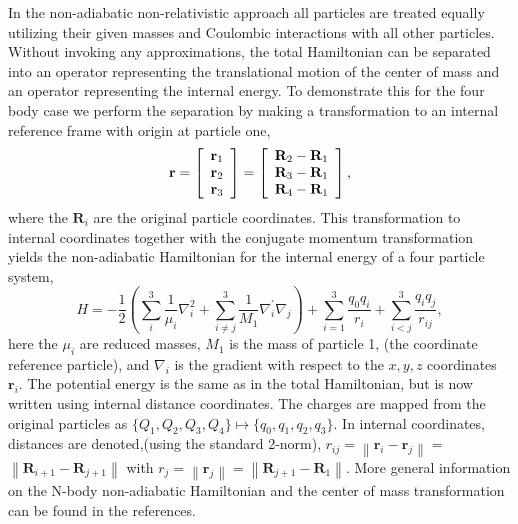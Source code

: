 In the non-adiabatic non-relativistic approach all particles are
treated equally utilizing their given masses and Coulombic
interactions with all other particles.  Without invoking any
approximations, the total Hamiltonian can be separated into an
operator representing the translational motion of the center of mass
and an operator representing the internal energy.  To demonstrate this
for the four body case we perform the separation by making a
transformation to an internal reference frame with origin at particle
one,
\begin{equation} \label{rdef}
\mathbf{r}=\left[
  \begin{array}[c]{c}
    \mathbf{r}_{1}\\
    \mathbf{r}_{2}\\
    \mathbf{r}_{3}
  \end{array}
  \right]  
  = \left[
    \begin{array}[c]{c}
      \mathbf{R}_{2}-\mathbf{R}_{1}\\
      \mathbf{R}_{3}-\mathbf{R}_{1}\\
      \mathbf{R}_{4}-\mathbf{R}_{1}\\
    \end{array}
  \right],
\end{equation}
where the $\mathbf{R}_{i}$ are the original particle coordinates.
This transformation to  internal coordinates together with the 
conjugate momentum transformation yields the non-adiabatic Hamiltonian
for the internal energy of a four particle system,
\begin{equation} \label{intham1}
H=-\frac{1}{2}\left(  \sum_{i}^{3}\frac{1}{\mu_{i}}\nabla_{i}^{2}
  +\sum_{i\neq j}^{3}\frac{1}{M_{1}}\nabla_{i}^{\prime}\nabla_{j} \right)
  +\sum_{i=1}^{3}\frac{q_{0}q_{i}}{r_{i}}  
  +\sum_{i<j}^{3}\frac{q_{i}q_{j}}{r_{ij}},
\end{equation}
here the $\mu_{i}$ are reduced masses, $M_{1}$ is the mass of particle 1,
(the coordinate reference particle), and $\nabla_{i}$ is the gradient with
respect to the $x,y,z$ coordinates $\mathbf{r}_{i}$. The potential energy is
the same as in the total Hamiltonian, but is now written using internal
distance coordinates. The charges are mapped from the original particles as
$\{Q_{1},Q_{2},Q_{3},Q_{4}\}\mapsto\{q_{0},q_{1},q_{2},q_{3}\}$. 
In internal coordinates, distances are denoted,(using the standard 2-norm), 
$r_{ij}=\left\|  \mathbf{r}_{i}-\mathbf{r}_{j}\right\|  =$ 
$\left\|  \mathbf{R}_{i+1}-\mathbf{R}_{j+1}\right\|$ with 
$r_{j}=\left\|  \mathbf{r}_{j}\right\|  =
\left\|  \mathbf{R}_{j+1}-\mathbf{R}_{1}\right\|$.
More general information on the N-body non-adiabatic Hamiltonian and the 
center of mass transformation can be found in the references\cite{Kinghorn99a}.

